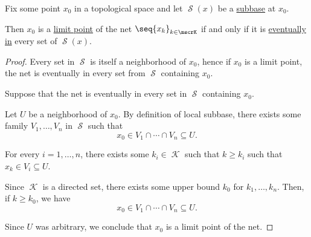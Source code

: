 \begin{proposition}\label{thm:net_limit_point_subbase}
  Fix some point \( x_0 \) in a topological space and let \( \mscrS(x) \) be a \hyperref[def:topological_subbase]{subbase} at \( x_0 \).

  Then \( x_0 \) is a \hyperref[def:net_limit_point]{limit point} of the net \( \seq{ x_k }_{k \in \mscrK} \) if and only if it is \hyperref[def:net_eventually_in]{eventually in} every set of \( \mscrS(x) \).
\end{proposition}
\begin{proof}
  \SufficiencySubProof Every set in \( \mscrS \) is itself a neighborhood of \( x_0 \), hence if \( x_0 \) is a limit point, the net is eventually in every set from \( \mscrS \) containing \( x_0 \).

  \NecessitySubProof Suppose that the net is eventually in every set in \( \mscrS \) containing \( x_0 \).

  Let \( U \) be a neighborhood of \( x_0 \). By definition of local subbase, there exists some family \( V_1, \ldots, V_n \) in \( \mscrS \) such that
  \begin{equation*}
    x_0 \in V_1 \cap \cdots \cap V_n \subseteq U.
  \end{equation*}

  For every \( i = 1, \ldots, n \), there exists some \( k_i \in \mscrK \) such that \( k \geq k_i \) such that \( x_k \in V_i \subseteq U \).

  Since \( \mscrK \) is a directed set, there exists some upper bound \( k_0 \) for \( k_1, \ldots, k_n \). Then, if \( k \geq k_0 \), we have
  \begin{equation*}
    x_0 \in V_1 \cap \cdots \cap V_n \subseteq U.
  \end{equation*}

  Since \( U \) was arbitrary, we conclude that \( x_0 \) is a limit point of the net.
\end{proof}

